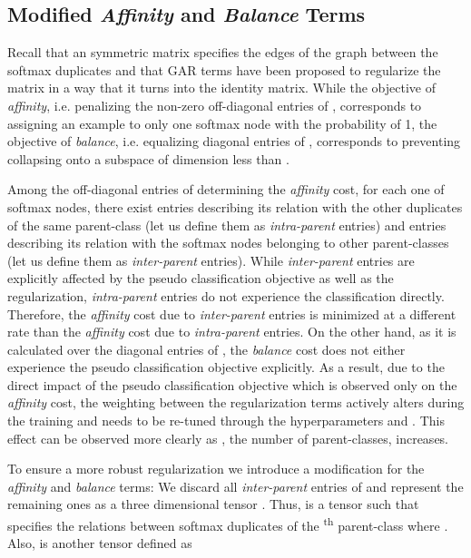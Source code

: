 \documentclass{article} \usepackage{iclr2018_conference,times}
\begin{document}
\subsection{Modified \textit{Affinity} and \textit{Balance} Terms} 

Recall that an  symmetric matrix  specifies the edges of the graph between the softmax duplicates and that GAR terms have been proposed to regularize the matrix  in a way that it turns into the identity matrix. While the objective of \textit{affinity}, i.e. penalizing the non-zero off-diagonal entries of , corresponds to assigning an example to only one softmax node with the probability of 1, the objective of \textit{balance}, i.e. equalizing diagonal entries of , corresponds to preventing collapsing onto a subspace of dimension less than . 

Among the off-diagonal entries of  determining the \textit{affinity} cost, for each one of  softmax nodes, there exist  entries describing its relation with the other duplicates of the same parent-class (let us define them as \textit{intra-parent} entries) and  entries describing its relation with the softmax nodes belonging to other parent-classes (let us define them as \textit{inter-parent} entries). While \textit{inter-parent} entries are explicitly affected by the pseudo classification objective as well as the regularization, \textit{intra-parent} entries do not experience the classification directly. Therefore, the \textit{affinity} cost due to \textit{inter-parent} entries is minimized at a different rate than the \textit{affinity} cost due to \textit{intra-parent} entries. On the other hand, as it is calculated over the diagonal entries of , the \textit{balance} cost does not either experience the pseudo classification objective explicitly. As a result, due to the direct impact of the pseudo classification objective which is observed only on the \textit{affinity} cost, the weighting between the regularization terms actively alters during the training and needs to be re-tuned through the hyperparameters  and . This effect can be observed more clearly as , the number of parent-classes, increases.

To ensure a more robust regularization we introduce a modification for the \textit{affinity} and \textit{balance} terms: We discard all \textit{inter-parent} entries of  and represent the remaining ones as a three dimensional tensor . Thus,  is a  tensor such that  specifies the relations between  softmax duplicates of the \textsuperscript{th} parent-class where . Also,   is another  tensor defined as 
\end{document}
